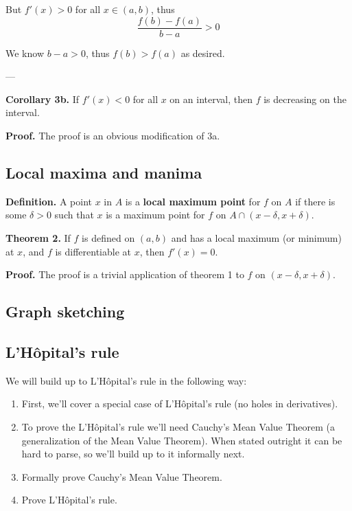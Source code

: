 But $f'(x)>0$ for all $x\in(a,b)$, thus
\[\frac{f(b)-f(a)}{b-a}>0\]

We know $b-a>0$, thus $f(b)>f(a)$ as desired.

\vs---\vs

\textbf{Corollary 3b.} If $f'(x)<0$ for all $x$ on an interval, then
$f$ is decreasing on the interval.

\vs

\textbf{Proof.} The proof is an obvious modification of 3a.

\subsection{Local maxima and manima}
\textbf{Definition.} A point $x$ in $A$ is a \textbf{local maximum
  point} for $f$ on $A$ if there is some $\delta>0$ such that $x$ is a
maximum point for $f$ on $A\cap(x-\delta, x+\delta)$.

\vs

\textbf{Theorem 2.} If $f$ is defined on $(a,b)$ and has a local
maximum (or minimum) at $x$, and $f$ is differentiable at $x$, then
$f'(x)=0$.

\vs

\textbf{Proof.} The proof is a trivial application of theorem 1 to $f$
on $(x-\delta, x+\delta)$.

\subsection{Graph sketching}

\subsection{L'H\^opital's rule}
We will build up to L'H\^opital's rule in the following way:

\begin{enumerate}
\item First, we'll cover a special case of L'H\^opital's rule (no
  holes in derivatives).
\item To prove the L'H\^opital's rule we'll need Cauchy's Mean Value
  Theorem (a generalization of the Mean Value Theorem). When stated
  outright it can be hard to parse, so we'll build up to it informally
  next.
\item Formally prove Cauchy's Mean Value Theorem.
\item Prove L'H\^opital's rule.
\end{enumerate}

